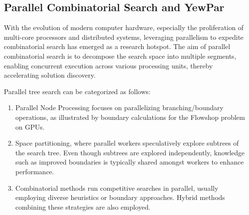 \documentclass{mproj}
\begin{document}
\subsection{Parallel Combinatorial Search and YewPar}
With the evolution of modern computer hardware, especially the proliferation of multi-core processors
and distributed systems, leveraging parallelism to expedite combinatorial search has emerged as a research hotspot.
The aim of parallel combinatorial search is to decompose the search space into multiple segments,
enabling concurrent execution across various processing units, thereby accelerating solution discovery.

Parallel tree search can be categorized\cite{gendron1994parallel} as follows:
\begin{enumerate}
    \item Parallel Node Processing focuses on parallelizing branching/boundary operations,
          as illustrated by boundary calculations for the Flowshop problem on GPUs\cite{gmys2016work}.
    \item Space partitioning, where parallel workers speculatively explore subtrees of the search tree.
          Even though subtrees are explored independently, knowledge such as improved boundaries is typically
          shared amongst workers to enhance performance.
    \item Combinatorial methods run competitive searches in parallel, usually employing diverse heuristics
          or boundary approaches. Hybrid methods combining these strategies are also employed.
\end{enumerate}
\end{document}
